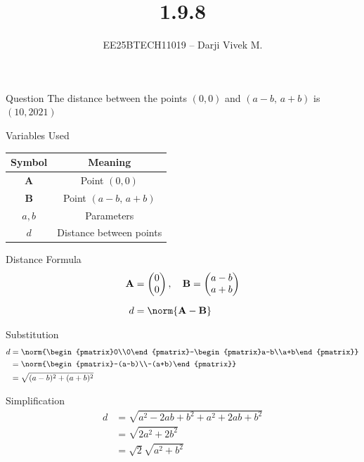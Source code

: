 \documentclass{beamer}
\title{1.9.8}
\author{EE25BTECH11019 -- Darji Vivek M.}
\date{}
\newcommand{\myvec}[1]{\begin{pmatrix}#1\end{pmatrix}}
\newcommand{\brak}[1]{\left( #1 \right)}
\renewcommand{\vec}[1]{\mathbf{#1}}
\begin{document}
\begin{frame}
  \titlepage
\end{frame}

\begin{frame}{Question}
The distance between the points 
\(\brak{0,0}\) and \(\brak{a-b,\,a+b}\) is 
\underline{\hspace{2cm}} 
\hfill $\brak{10,2021}$
\end{frame}

\begin{frame}{Variables Used}
\begin{table}[h!]    
  \centering
  \begin{tabular}{|c|c|}
    \hline
    Symbol & Meaning \\ \hline
    $\vec{A}$ & Point $(0,0)$ \\ \hline
    $\vec{B}$ & Point $(a-b,\,a+b)$ \\ \hline
    $a,b$ & Parameters \\ \hline
    $d$ & Distance between points \\ \hline
  \end{tabular}
\end{table}
\end{frame}

\begin{frame}{Distance Formula}
\begin{align}
\vec{A} &= \myvec{0\\0}, \quad
\vec{B} = \myvec{a-b\\a+b} \\[2mm]
d &= \norm{\vec{A}-\vec{B}}
\end{align}
\end{frame}

\begin{frame}{Substitution}
\begin{align}
d &= \norm{\myvec{0\\0}-\myvec{a-b\\a+b}} \\
  &= \norm{\myvec{-(a-b)\\-(a+b)}} \\
  &= \sqrt{(a-b)^2 + (a+b)^2}
\end{align}
\end{frame}

\begin{frame}{Simplification}
\begin{align}
d &= \sqrt{a^2 - 2ab + b^2 + a^2 + 2ab + b^2} \\
  &= \sqrt{2a^2 + 2b^2} \\
  &= \sqrt{2}\sqrt{a^2+b^2}
\end{align}
\end{frame}
\end{document}
